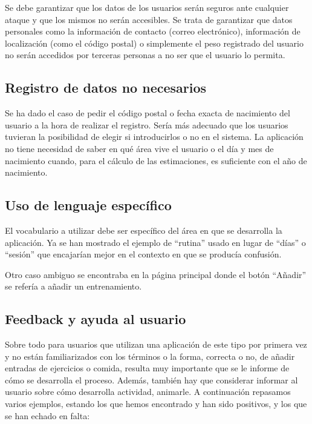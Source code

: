 \documentclass[a4paper]{article}
\begin{document}
	Se debe garantizar que los datos de los usuarios serán seguros ante cualquier ataque y que los mismos no serán accesibles. Se trata de garantizar que datos personales como la información de contacto (correo electrónico), información de localización (como el código postal) o simplemente el peso registrado del usuario no serán accedidos por terceras personas a no ser que el usuario lo permita.
	
	\subsection{Registro de datos no necesarios}
	
	Se ha dado el caso de pedir el código postal o fecha exacta de nacimiento del usuario a la hora de realizar el registro. Sería más adecuado que los usuarios tuvieran la posibilidad de elegir si introducirlos o no en el sistema. La aplicación no tiene necesidad de saber en qué área vive el usuario o el día y mes de nacimiento cuando, para el cálculo de las estimaciones, es suficiente con el año de nacimiento.
	
	\subsection{Uso de lenguaje específico}
	
	El vocabulario a utilizar debe ser específico del área en que se desarrolla la aplicación. Ya se han mostrado el ejemplo de ``rutina'' usado en lugar de ``días'' o ``sesión'' que encajarían mejor en el contexto en que se producía confusión.
	
	Otro caso ambiguo se encontraba en la página principal donde el botón ``Añadir'' se refería a añadir un entrenamiento.
	
	\subsection{Feedback y ayuda al usuario}
	
	Sobre todo para usuarios que utilizan una aplicación de este tipo por primera vez y no están familiarizados con los términos o la forma, correcta o no, de añadir entradas de ejercicios o comida, resulta muy importante que se le informe de cómo se desarrolla el proceso. Además, también hay que considerar informar al usuario sobre cómo desarrolla actividad, animarle.  A continuación repasamos varios ejemplos, estando los que hemos encontrado y han sido positivos, y los que se han echado en falta:
	
\end{document}
